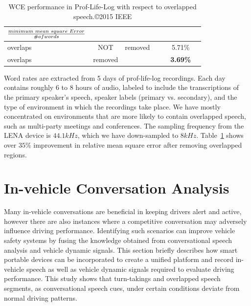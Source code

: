 \begin{table}[b!]
	\centering
	\renewcommand{\tabcolsep}{2.5 mm}
	\renewcommand{\arraystretch}{1.3}
	\vspace{0mm}
	\caption {WCE performance in Prof-Life-Log with respect to overlapped speech.\copyright 2015 IEEE}
	\label{tab:wce_ovl}
	\vspace{2mm}
	\begin{tabular}{p{0.8cm}*{6}{c}}
		\bf $\frac{minimum\hspace{1mm} mean \hspace{1mm} square \hspace{1mm} Error}{\# of words}$\\ \hline \hline
		overlaps & NOT&\hspace{-7mm}removed	&  &     &    5.71\% \\ 
		overlaps&\hspace{1mm} removed	&		&	&     &    \bf3.69\% \\ \hline
	\end{tabular}
	\vspace{-1mm}
\end{table} 

Word rates are extracted from 5 days of prof-life-log recordings. 
Each day contains roughly 6 to 8 hours of audio, labeled to include the transcriptions of the primary speaker's speech, speaker labels (primary vs. secondary), and the type of environment in which the recordings take place. 
We have mostly concentrated on environments that are more likely to contain overlapped speech, such as multi-party meetings and conferences.
The sampling frequency from the LENA device is $44.1kHz$, which we have down-sampled to $8kHz$. Table~\ref{tab:wce_ovl} shows over $35\%$ improvement in relative mean square error after removing overlapped regions. 


\newpage
\section{In-vehicle Conversation Analysis}
\label{sec:invehicle}
Many in-vehicle conversations are beneficial in keeping drivers alert and active, however there are also instances where a competitive conversation may adversely influence driving performance. 
Identifying such scenarios can improve vehicle safety systems by fusing the knowledge obtained from conversational speech analysis and vehicle dynamic signals. 
This section briefly describes how smart portable devices can be incorporated to create a unified platform and record in-vehicle speech as well as vehicle dynamic signals required to evaluate driving performance. 
This study shows that turn-takings and overlapped speech segments, as conversational speech cues, under certain conditions deviate from normal driving patterns. 

